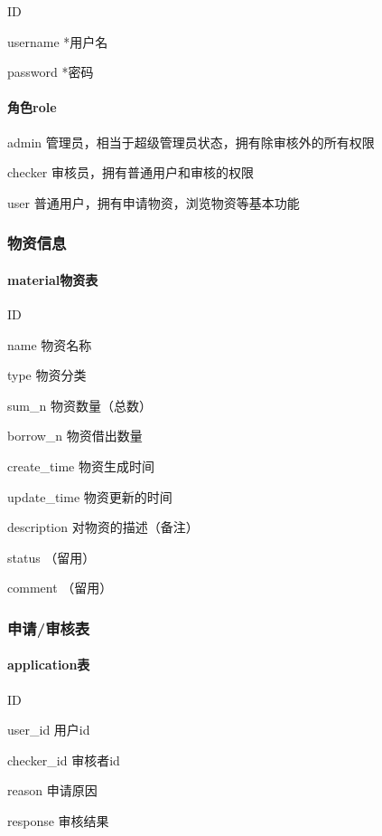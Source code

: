 \documentclass[a4paper,fancyhdr,fntef,hyperref]{ctexart}
\begin{document}
ID

username *用户名

password *密码

\paragraph{角色role}\label{ux89d2ux8272role}

admin 管理员，相当于超级管理员状态，拥有除审核外的所有权限

checker 审核员，拥有普通用户和审核的权限

user 普通用户，拥有申请物资，浏览物资等基本功能

\subsubsection{物资信息}\label{ux7269ux8d44ux4fe1ux606f}

\paragraph{material物资表}\label{materialux7269ux8d44ux8868}

ID

name 物资名称

type 物资分类

sum\_n 物资数量（总数）

borrow\_n 物资借出数量

create\_time 物资生成时间

update\_time 物资更新的时间

description 对物资的描述（备注）

status （留用）

comment （留用）

\subsubsection{申请/审核表}\label{ux7533ux8bf7ux5ba1ux6838ux8868}

\paragraph{application表}\label{applicationux8868}

ID

user\_id 用户id

checker\_id 审核者id

reason 申请原因

response 审核结果
\end{document}
